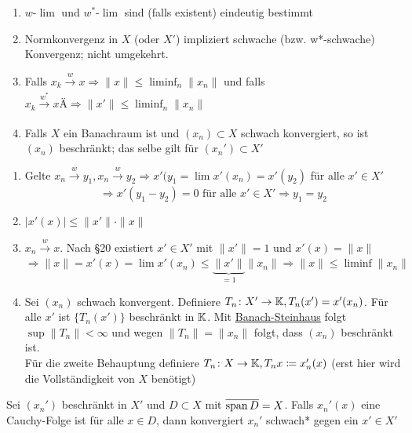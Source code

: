 \begin{eig}
	\begin{enumerate}[label=\alph*\upshape)]
		\item $w$-$\lim$ und $w^{*}$-$\lim$ sind (falls existent) eindeutig bestimmt
		\item Normkonvergenz in $X$ (oder $X'$) impliziert schwache (bzw. w*-schwache) Konvergenz; nicht umgekehrt.
		\item Falls $x_{k} \xrightarrow[]{w} x \Rightarrow \| x \| \leq \liminf_{n} \| x_{n} \|$ und falls $x_{k} \xrightarrow[]{w^{*}} xÄ \Rightarrow \| x' \| \leq \liminf_{n} \| x_{n} \|$ 
		\item Falls $X$ ein Banachraum ist und $(x_{n}) \subset X$ schwach konvergiert, so ist $(x_{n})$ beschränkt; das selbe gilt für $(x_{n}') \subset X'$
	\end{enumerate}	
\end{eig}

\newpage %

\begin{beweis}
	\begin{enumerate}[label=\alph*\upshape)]
		\item Gelte $x_{n} \xrightarrow[]{w} y_{1}, x_{n} \xrightarrow[]{w} y_{2} \Rightarrow x'(y_{1} = \lim x'(x_{n}) = x'(y_{2})$ für alle $x' \in X'$
			\[ \Rightarrow x'(y_{1} - y_{2}) = 0 \text{ für alle } x' \in X' \Rightarrow y_{1} = y_{2} \]
		\item $| x'(x) | \leq \| x' \| \cdot \| x \|$
		\item $x_{n} \xrightarrow[]{w} x$. Nach \S 20 existiert $x' \in X'$ mit $\| x' \| = 1$ und $x'(x) = \| x \|$
			\[ \Rightarrow \| x \| = x'(x) = \lim x'(x_{n}) \leq \underbrace{\| x' \|}_{= 1} \| x_{n} \| \Rightarrow \| x \| \leq \liminf \| x_{n} \| \]
		\item Sei $(x_{n})$ schwach konvergent. Definiere $T_{n} \colon X' \rightarrow \mathbb{K}, T_{n}(x') = x'(x_{n})$. Für alle $x'$ ist $\{ T_{n}(x') \}$ beschränkt in $\mathbb{K}$. Mit \hyperref[satz:9.5-Banach-Steinhaus]{Banach-Steinhaus} folgt $\sup \| T_{n} \| < \infty$ und wegen $\| T_{n} \| = \| x_{n} \|$ folgt, dass $(x_{n})$ beschränkt ist. \\
			Für die zweite Behauptung definiere $T_{n} \colon X \rightarrow \mathbb{K}, T_{n} x \coloneqq x_{n}'(x)$ (erst hier wird die Vollständigkeit von $X$ benötigt)
	\end{enumerate}		
\end{beweis}


\begin{lemma}
	Sei $(x_{n}')$ beschränkt in $X'$ und $D \subset X$ mit $\overline{\operatorname{span} D} = X$. Falls $x_{n}'(x)$ eine Cauchy-Folge ist für alle $x \in D$, dann konvergiert $x_{n}'$ schwach* gegen ein $x' \in X'$
\end{lemma}

